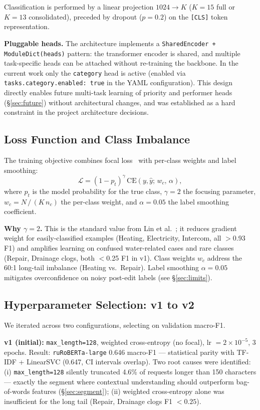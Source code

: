 \documentclass[11pt]{article}
\begin{document}
Classification is performed by a linear projection $1024 \to K$ ($K{=}15$
full or $K{=}13$ consolidated), preceded by dropout ($p{=}0.2$) on the
\texttt{[CLS]} token representation.

\textbf{Pluggable heads.} The architecture implements a
\texttt{SharedEncoder + ModuleDict(heads)} pattern: the transformer encoder is
shared, and multiple task-specific heads can be attached without re-training
the backbone. In the current work only the \texttt{category} head is active
(enabled via \texttt{tasks.category.enabled: true} in the YAML configuration).
This design directly enables future multi-task learning of priority and
performer heads (\S\ref{sec:future}) without architectural changes, and was
established as a hard constraint in the project architecture decisions.

\subsection{Loss Function and Class Imbalance}
The training objective combines focal loss~\cite{lin2017focal} with per-class
weights and label smoothing:
\begin{equation}
  \mathcal{L} = (1 - p_t)^{\gamma}\,\mathrm{CE}(y,\hat{y};\,w_c,\,\alpha),
  \label{eq:focal}
\end{equation}
where $p_t$ is the model probability for the true class, $\gamma = 2$ the
focusing parameter, $w_c = N\,/\,(K\,n_c)$ the per-class weight, and
$\alpha = 0.05$ the label smoothing coefficient.

\textbf{Why $\gamma=2$.} This is the standard value from Lin et
al.~\cite{lin2017focal}; it reduces gradient weight for easily-classified
examples (Heating, Electricity, Intercom, all $>$0.93 F1) and amplifies
learning on confused water-related cases and rare classes (Repair, Drainage
clogs, both $<$0.25 F1 in v1). Class weights $w_c$ address the 60:1 long-tail
imbalance (Heating vs.\ Repair). Label smoothing $\alpha{=}0.05$ mitigates
overconfidence on noisy post-edit labels (see \S\ref{sec:limits}).

\subsection{Hyperparameter Selection: v1 to v2}
\label{sec:hparam}
We iterated across two configurations, selecting on validation macro-F1.

\textbf{v1 (initial):} \texttt{max\_length=128}, weighted cross-entropy (no
focal), lr $= 2{\times}10^{-5}$, 3 epochs. Result: \texttt{ruRoBERTa-large}
0.646 macro-F1 --- statistical parity with TF-IDF + LinearSVC (0.647, CI
intervals overlap). Two root causes were identified: (i)
\texttt{max\_length=128} silently truncated 4.6\% of requests longer than 150
characters --- exactly the segment where contextual understanding should
outperform bag-of-words features (\S\ref{sec:segment}); (ii) weighted
cross-entropy alone was insufficient for the long tail (Repair, Drainage
clogs F1 $< 0.25$).
\end{document}
